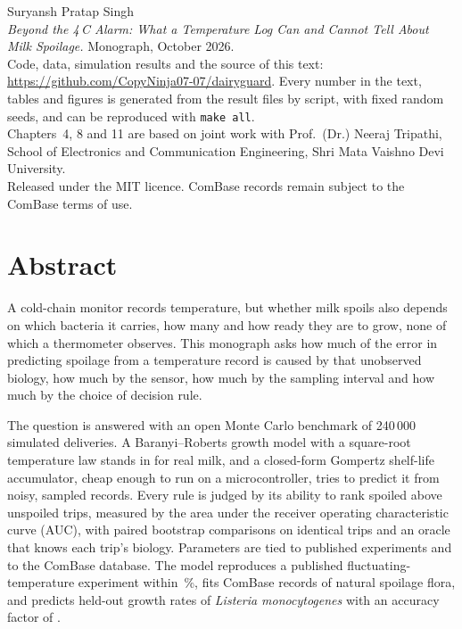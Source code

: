 \documentclass[11pt,a4paper,twoside,openany]{book}
\theoremstyle{plain}\newtheorem{proposition}{Proposition}\newtheorem{corollary}{Corollary}
\theoremstyle{definition}\newtheorem{definition}{Definition}[chapter]
\begin{document}
\frontmatter


\thispagestyle{empty}
\vspace*{\fill}
{\small\noindent Suryansh Pratap Singh\\
\textit{Beyond the 4\,\textdegree C Alarm: What a Temperature Log Can and Cannot Tell About Milk Spoilage.} Monograph, October 2026.\\[6pt]
Code, data, simulation results and the source of this text: \url{https://github.com/CopyNinja07-07/dairyguard}. Every number in the text, tables and figures is generated from the result files by script, with fixed random seeds, and can be reproduced with \texttt{make all}.\\[6pt]
Chapters~4, 8 and 11 are based on joint work with Prof.\ (Dr.) Neeraj Tripathi, School of Electronics and Communication Engineering, Shri Mata Vaishno Devi University.\\[6pt]
Released under the MIT licence. ComBase records remain subject to the ComBase terms of use.\par}

\chapter*{Abstract}
A cold-chain monitor records temperature, but whether milk spoils also depends on which bacteria it carries, how many and how ready they are to grow, none of which a thermometer observes. This monograph asks how much of the error in predicting spoilage from a temperature record is caused by that unobserved biology, how much by the sensor, how much by the sampling interval and how much by the choice of decision rule.

The question is answered with an open Monte Carlo benchmark of 240\,000 simulated deliveries. A Baranyi--Roberts growth model with a square-root temperature law stands in for real milk, and a closed-form Gompertz shelf-life accumulator, cheap enough to run on a microcontroller, tries to predict it from noisy, sampled records. Every rule is judged by its ability to rank spoiled above unspoiled trips, measured by the area under the receiver operating characteristic curve (AUC), with paired bootstrap comparisons on identical trips and an oracle that knows each trip's biology. Parameters are tied to published experiments and to the ComBase database. The model reproduces a published fluctuating-temperature experiment within \NumLinErrAbs\,\%, fits \NumCbNfit{} ComBase records of natural spoilage flora, and predicts \NumLisHeld{} held-out growth rates of \textit{Listeria monocytogenes} with an accuracy factor of \NumLisAccHeld.
\end{document}
